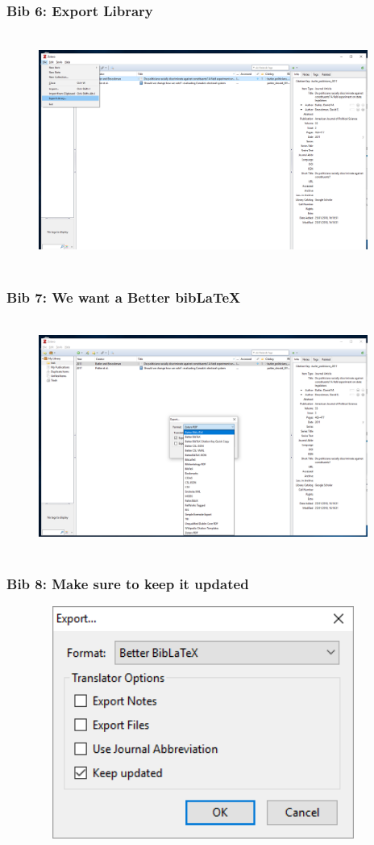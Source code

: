 \documentclass[12pt]{beamer}
\begin{document}
\begin{frame} \frametitle{Bib 6: Export Library} \begin{figure}[!h] \centering
	\includegraphics[height=3in, width = 4.25in,keepaspectratio]{zotero/bibtex_6.png}
\end{figure} \end{frame}

\begin{frame} \frametitle{Bib 7: We want a Better bibLaTeX} \begin{figure}[!h] \centering
	\includegraphics[height=3in, width = 4.25in,keepaspectratio]{zotero/bibtex_7.png}
\end{figure} \end{frame}

\begin{frame} \frametitle{Bib 8: Make sure to keep it updated} \begin{figure}[!h] \centering
	\includegraphics[height=3in, width = 4.25in,keepaspectratio]{zotero/bibtex_8.png}
\end{figure} \end{frame}
\end{document}
